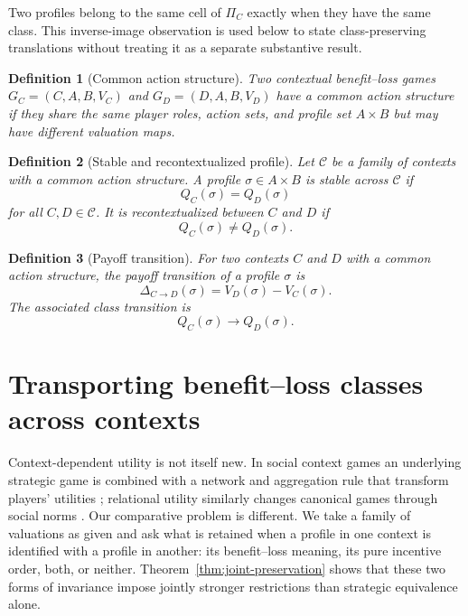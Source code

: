 \documentclass[a4paper,fleqn]{cas-dc}
\newtheorem{definition}{Definition}[section]
\theoremstyle{remark}
\begin{document}
Two profiles belong to the same cell of $\Pi_C$ exactly when they have the
same class.  This inverse-image observation is used below to state
class-preserving translations without treating it as a separate substantive
result.

\begin{definition}[Common action structure]
Two contextual benefit--loss games $G_C=(C,A,B,V_C)$ and $G_D=(D,A,B,V_D)$ have a common action structure if they share the same player roles, action sets, and profile set $A\times B$ but may have different valuation maps.
\end{definition}

\begin{definition}[Stable and recontextualized profile]
Let $\mathcal C$ be a family of contexts with a common action structure. A profile $\sigma\in A\times B$ is stable across $\mathcal C$ if
\[
Q_C(\sigma)=Q_D(\sigma)
\]
for all $C,D\in\mathcal C$. It is recontextualized between $C$ and $D$ if
\[
Q_C(\sigma)\ne Q_D(\sigma).
\]
\end{definition}

\begin{definition}[Payoff transition]
For two contexts $C$ and $D$ with a common action structure, the payoff transition of a profile $\sigma$ is
\[
\Delta_{C\to D}(\sigma)=V_D(\sigma)-V_C(\sigma).
\]
The associated class transition is
\[
Q_C(\sigma)\longrightarrow Q_D(\sigma).
\]
\end{definition}



\section{Transporting benefit--loss classes across contexts}
\label{sec:translations}

Context-dependent utility is not itself new.  In social context games an
underlying strategic game is combined with a network and aggregation rule that
transform players' utilities \citep{AshlagiKrystaTennenholtz2008}; relational
utility similarly changes canonical games through social norms
\citep{SuMorsky2024}.  Our comparative problem is different.  We take a family
of valuations as given and ask what is retained when a profile in one context
is identified with a profile in another: its benefit--loss meaning, its pure
incentive order, both, or neither.  Theorem~\ref{thm:joint-preservation} shows
that these two forms of invariance impose jointly stronger restrictions than
strategic equivalence alone.
\end{document}

